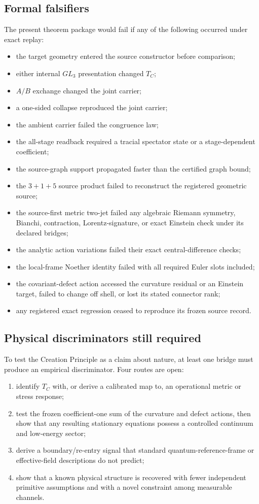 \documentclass[11pt]{article}
\theoremstyle{definition}
\theoremstyle{remark}
\begin{document}
\subsection{Formal falsifiers}

The present theorem package would fail if any of the following occurred under exact replay:
\begin{itemize}
\item the target geometry entered the source constructor before comparison;
\item either internal $GL_3$ presentation changed $T_C$;
\item $A/B$ exchange changed the joint carrier;
\item a one-sided collapse reproduced the joint carrier;
\item the ambient carrier failed the congruence law;
\item the all-stage readback required a tracial spectator state or a stage-dependent coefficient;
\item the source-graph support propagated faster than the certified graph bound;
\item the $3+1+5$ source product failed to reconstruct the registered geometric source;
\item the source-first metric two-jet failed any algebraic Riemann symmetry, Bianchi, contraction, Lorentz-signature, or exact Einstein check under its declared bridges;
\item the analytic action variations failed their exact central-difference checks;
\item the local-frame Noether identity failed with all required Euler slots included;
\item the covariant-defect action accessed the curvature residual or an Einstein target, failed to change off shell, or lost its stated connector rank;
\item any registered exact regression ceased to reproduce its frozen source record.
\end{itemize}

\subsection{Physical discriminators still required}

To test the Creation Principle as a claim about nature, at least one bridge must produce an empirical discriminator. Four routes are open:
\begin{enumerate}
\item identify $T_C$ with, or derive a calibrated map to, an operational metric or stress response;
\item test the frozen coefficient-one sum of the curvature and defect actions, then show that any resulting stationary equations possess a controlled continuum and low-energy sector;
\item derive a boundary/re-entry signal that standard quantum-reference-frame or effective-field descriptions do not predict;
\item show that a known physical structure is recovered with fewer independent primitive assumptions and with a novel constraint among measurable channels.
\end{enumerate}
\end{document}

